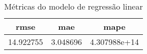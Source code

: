 \begin{table}
\centering
\caption{Métricas do modelo de regressão linear}
\label{tab:lin_metrics}
\begin{tabular}{ccc}
\toprule
     rmse &      mae &         mape \\
\midrule
14.922755 & 3.048696 & 4.307988e+14 \\
\bottomrule
\end{tabular}
\end{table}
